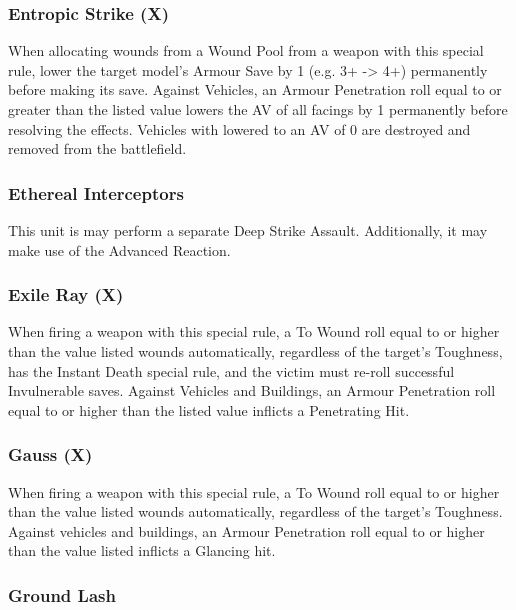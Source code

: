 \begin{multicols}{2}
\subsubsection{Entropic Strike (X)} \label{Entropic Strike}

When allocating wounds from a Wound Pool from a weapon with this special rule, lower the target model's Armour Save by 1 (e.g. 3+ -> 4+) permanently before making its save. Against Vehicles, an Armour Penetration roll equal to or greater than the listed value lowers the AV of all facings by 1 permanently before resolving the effects. Vehicles with lowered to an AV of 0 are destroyed and removed from the battlefield.

\subsubsection{Ethereal Interceptors} \label{Ethereal Interceptors}

This unit is may perform a separate Deep Strike Assault. Additionally, it may make use of the  Advanced Reaction.

\subsubsection{Exile Ray (X)} \label{Exile Ray}

When firing a weapon with this special rule, a To Wound roll equal to or higher than the value listed wounds automatically, regardless of the target's Toughness, has the Instant Death special rule, and the victim must re-roll successful Invulnerable saves. Against Vehicles and Buildings, an Armour Penetration roll equal to or higher than the listed value inflicts a Penetrating Hit.

\subsubsection{Gauss (X)} \label{Gauss}

When firing a weapon with this special rule, a To Wound roll equal to or higher than the value listed wounds automatically, regardless of the target’s Toughness. Against vehicles and buildings, an Armour Penetration roll equal to or higher than the value listed inflicts a Glancing hit.

\subsubsection{Ground Lash} \label{Ground Lash}


\end{multicols}
